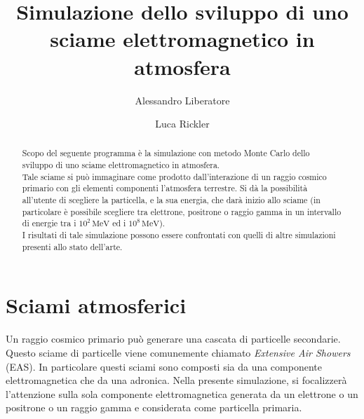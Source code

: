 \documentclass[10pt,a4paper,usenatbib]{article}
\newcommand*{\unit}[1]{\ensuremath{\mathrm{\,#1}}}                              %
\begin{document}
\author{Alessandro Liberatore \and Luca Rickler}
\title{Simulazione dello sviluppo di uno sciame elettromagnetico in atmosfera}
\maketitle

\begin{abstract}
Scopo del seguente programma è la simulazione con metodo Monte Carlo dello sviluppo di uno sciame elettromagnetico in atmosfera. 
\\Tale sciame si può immaginare come prodotto dall'interazione di un raggio cosmico primario con gli elementi componenti l'atmosfera terrestre. Si dà la possibilità all'utente di scegliere la particella, e la sua energia, che darà inizio allo sciame (in particolare è possibile scegliere tra elettrone, positrone o raggio gamma in un intervallo di energie tra i $10^2\unit{MeV}$ ed i $10^8\unit{MeV}$). 
\\I risultati di tale simulazione possono essere confrontati con quelli di altre simulazioni presenti allo stato dell'arte. 
\end{abstract}


\section{Sciami atmosferici}
Un raggio cosmico primario può generare una cascata di particelle secondarie. Questo sciame di particelle viene comunemente chiamato \textit{Extensive Air Showers} (EAS). In particolare questi sciami sono composti sia da una componente elettromagnetica che da una adronica. Nella presente simulazione, si focalizzerà l'attenzione sulla sola componente elettromagnetica generata da un elettrone o un positrone o un raggio gamma e considerata come particella primaria. 
\end{document}
